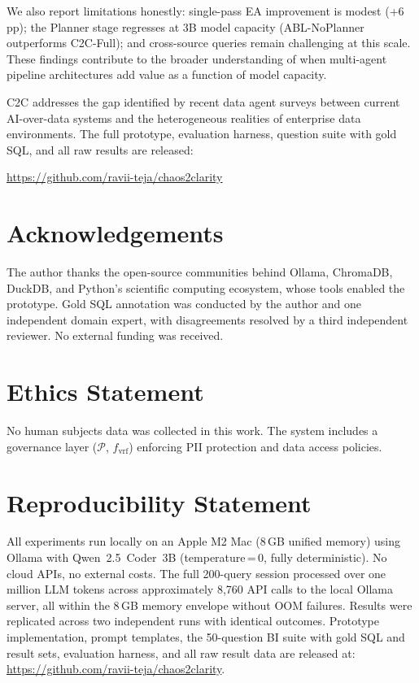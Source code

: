 \documentclass[11pt,a4paper]{article}
\begin{document}
We also report limitations honestly: single-pass EA improvement is modest (+6\,pp);
the Planner stage regresses at 3B model capacity (ABL-NoPlanner outperforms
C2C-Full); and cross-source queries remain challenging at this scale.  These
findings contribute to the broader understanding of when multi-agent pipeline
architectures add value as a function of model capacity.

C2C addresses the gap identified by recent data agent surveys
\citep{rahman2025llm,zhu2025data} between current AI-over-data systems and the
heterogeneous realities of enterprise data environments.  The full prototype,
evaluation harness, question suite with gold SQL, and all raw results are released:
\begin{center}
\url{https://github.com/ravii-teja/chaos2clarity}
\end{center}

\section*{Acknowledgements}
The author thanks the open-source communities behind Ollama, ChromaDB, DuckDB,
and Python's scientific computing ecosystem, whose tools enabled the prototype.
Gold SQL annotation was conducted by the author and one independent domain expert,
with disagreements resolved by a third independent reviewer.  No external funding
was received.

\section*{Ethics Statement}
No human subjects data was collected in this work.  The system includes a
governance layer ($\mathcal{P}$, $f_\mathrm{vrf}$) enforcing PII protection and
data access policies.

\section*{Reproducibility Statement}
All experiments run locally on an Apple M2 Mac (8\,GB unified memory) using Ollama
with Qwen~2.5~Coder~3B (temperature\,=\,0, fully deterministic).  No cloud APIs,
no external costs.  The full 200-query session processed over one million LLM
tokens across approximately 8,760 API calls to the local Ollama server, all within
the 8\,GB memory envelope without OOM failures.  Results were replicated across two
independent runs with identical outcomes.  Prototype implementation, prompt
templates, the 50-question BI suite with gold SQL and result sets, evaluation
harness, and all raw result data are released at:
\url{https://github.com/ravii-teja/chaos2clarity}.
\end{document}
